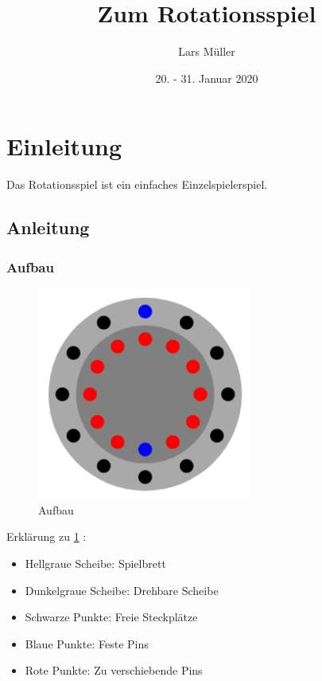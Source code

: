 \documentclass{article}
\title{Zum Rotationsspiel}
\author{Lars Müller}
\date{20. - 31. Januar 2020}
\begin{document}
\maketitle
\tableofcontents
\section{Einleitung}

Das Rotationsspiel ist ein einfaches Einzelspielerspiel.

\subsection{Anleitung}

\subsubsection{Aufbau}

\begin{figure}
    \centering
    \includegraphics[width=200pt]{darstellung.png}
    \caption{Aufbau}
    \label{fig:darstellung}
\end{figure}

Erklärung zu \ref{fig:darstellung} :

\begin{itemize}
    \item[\textcolor{lightgray}{\textbullet}] Hellgraue Scheibe: Spielbrett
    \item[\textcolor{gray}{\textbullet}] Dunkelgraue Scheibe: Drehbare Scheibe    \item[\textcolor{black}{\textbullet}] Schwarze Punkte: Freie Steckplätze
    \item[\textcolor{blue}{\textbullet}] Blaue Punkte: Feste Pins
    \item[\textcolor{red}{\textbullet}] Rote Punkte: Zu verschiebende Pins
\end{itemize}
\end{document}
